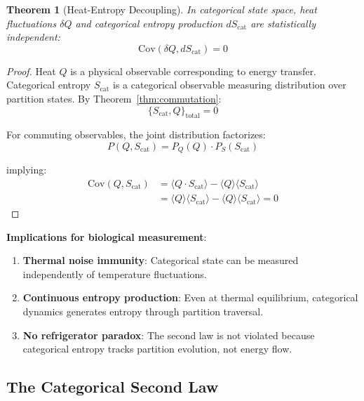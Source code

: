 \documentclass[twocolumn,10pt]{article}
\newtheorem{theorem}{Theorem}[section]
\begin{document}
\begin{theorem}[Heat-Entropy Decoupling]
\label{thm:decoupling}
In categorical state space, heat fluctuations $\delta Q$ and categorical entropy production $dS_{\text{cat}}$ are statistically independent:
\begin{equation}
    \text{Cov}(\delta Q, dS_{\text{cat}}) = 0
    \label{eq:decoupling}
\end{equation}
\end{theorem}

\begin{proof}
Heat $Q$ is a physical observable corresponding to energy transfer. Categorical entropy $S_{\text{cat}}$ is a categorical observable measuring distribution over partition states. By Theorem~\ref{thm:commutation}:
\begin{equation}
    \{S_{\text{cat}}, Q\}_{\text{total}} = 0
\end{equation}

For commuting observables, the joint distribution factorizes:
\begin{equation}
    P(Q, S_{\text{cat}}) = P_Q(Q) \cdot P_S(S_{\text{cat}})
\end{equation}

implying:
\begin{align}
    \text{Cov}(Q, S_{\text{cat}}) &= \langle Q \cdot S_{\text{cat}} \rangle - \langle Q \rangle \langle S_{\text{cat}} \rangle \\
    &= \langle Q \rangle \langle S_{\text{cat}} \rangle - \langle Q \rangle \langle S_{\text{cat}} \rangle = 0
\end{align}
\end{proof}

\textbf{Implications for biological measurement}:
\begin{enumerate}
    \item \textbf{Thermal noise immunity}: Categorical state can be measured independently of temperature fluctuations.
    \item \textbf{Continuous entropy production}: Even at thermal equilibrium, categorical dynamics generates entropy through partition traversal.
    \item \textbf{No refrigerator paradox}: The second law is not violated because categorical entropy tracks partition evolution, not energy flow.
\end{enumerate}

\subsection{The Categorical Second Law}
\end{document}
